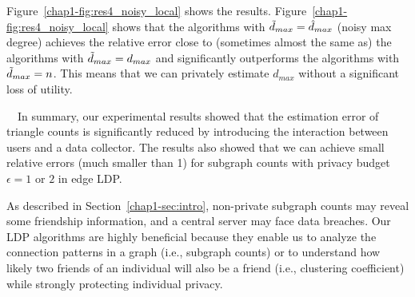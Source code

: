 Figure~\ref{chap1-fig:res4_noisy_local} shows the results. 
Figure~\ref{chap1-fig:res4_noisy_local} shows that 
the algorithms with $\tilde{d}_{max} = \hat{d}_{max}$ (noisy max degree) 
achieves the relative error close to (sometimes almost the same as) 
the algorithms with $\tilde{d}_{max} = d_{max}$ 
and significantly outperforms 
the algorithms with $\tilde{d}_{max} = n$. 
This means that we can privately estimate $d_{max}$ without a significant loss of utility. 

\smallskip
{}~~In summary, 
our experimental results showed that the estimation error of triangle counts is significantly reduced by introducing the interaction between users and a data collector. 
The results also showed that 
we can achieve small relative errors 
(much smaller than 1) for subgraph counts 
with privacy budget $\epsilon=1$ or $2$ in edge LDP. 

As described in Section~\ref{chap1-sec:intro}, non-private 
subgraph 
counts may reveal some friendship information, and a central server may face data breaches. 
Our LDP algorithms are highly beneficial because they enable us to analyze the connection patterns in a graph 
(i.e., subgraph counts) 
or to understand how likely two friends of an individual will also be a friend 
(i.e., clustering coefficient) 
while strongly protecting individual privacy.
